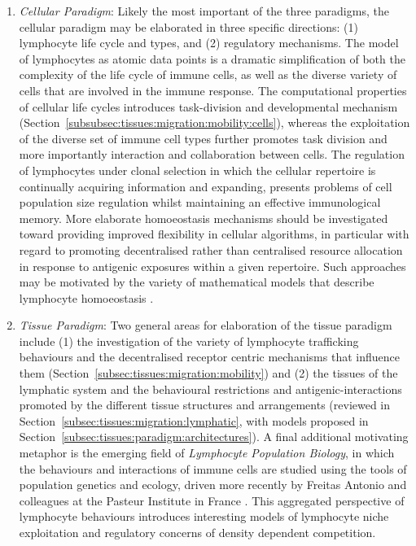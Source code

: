 \begin{enumerate}
	\item \emph{Cellular Paradigm}: Likely the most important of the three paradigms, the cellular paradigm may be elaborated in three specific directions: (1) lymphocyte life cycle and types, and (2) regulatory mechanisms. The model of lymphocytes as atomic data points is a dramatic simplification of both the complexity of the life cycle of immune cells, as well as the diverse variety of cells that are involved in the immune response. The computational properties of cellular life cycles introduces task-division and developmental mechanism (Section~\ref{subsubsec:tissues:migration:mobility:cells}), whereas the exploitation of the diverse set of immune cell types further promotes task division and more importantly interaction and collaboration between cells. 
	The regulation of lymphocytes under clonal selection in which the cellular repertoire is continually acquiring information and expanding, presents problems of cell population size regulation whilst maintaining an effective immunological memory. More elaborate homoeostasis mechanisms should be investigated toward providing improved flexibility in cellular algorithms, in particular with regard to promoting decentralised rather than centralised resource allocation in response to antigenic exposures within a given repertoire. Such approaches may be motivated by the variety of mathematical models that describe lymphocyte homoeostasis \cite{McLean1997, Cunliffe2006}.
	
	\item \emph{Tissue Paradigm}: Two general areas for elaboration of the tissue paradigm include (1) the investigation of the variety of lymphocyte trafficking behaviours and the decentralised receptor centric mechanisms that influence them (Section~\ref{subsec:tissues:migration:mobility}) and (2) the tissues of the lymphatic system and the behavioural restrictions and antigenic-interactions promoted by the different tissue structures and arrangements (reviewed in Section~\ref{subsec:tissues:migration:lymphatic}, with models proposed in Section~\ref{subsec:tissues:paradigm:architectures}).
	A final additional motivating metaphor is the emerging field of \emph{Lymphocyte Population Biology}, in which the behaviours and interactions of immune cells are studied using the tools of population genetics and ecology, driven more recently by Freitas Antonio and colleagues at the Pasteur Institute in France \cite{Freitas2000, Gaudin2004, Agenes2000}. This aggregated perspective of lymphocyte behaviours introduces interesting models of lymphocyte niche exploitation and regulatory concerns of density dependent competition.
	

\end{enumerate}
